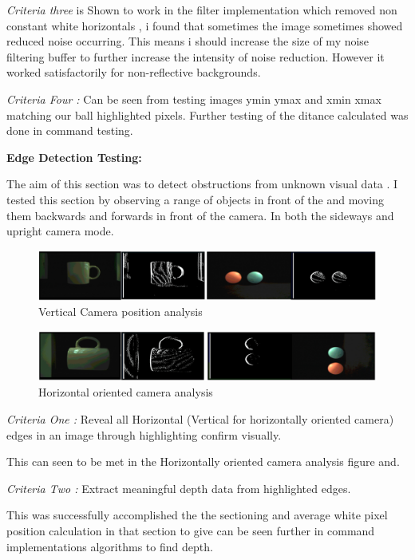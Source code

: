 \documentclass[10pt,twoside]{article}
\begin{document}
\textit{Criteria three} is Shown to work in the filter implementation which removed non constant white horizontals , i found that sometimes the image sometimes showed reduced noise occurring. This means i should increase the size of my noise filtering buffer to further increase the intensity of noise reduction. However it worked satisfactorily for non-reflective backgrounds. 
 
\textit{Criteria Four : } Can be seen from testing images ymin ymax and xmin xmax matching our ball highlighted pixels. Further testing of the ditance calculated was done in command testing.


\textbf{Edge Detection Testing: }

The aim of this section was to detect obstructions from unknown visual data . I tested this section by observing a range of objects in front of the and moving them backwards and forwards in front of the camera. In both the sideways and upright camera mode.

\begin{figure}[hbt!]
    \centering
    \includegraphics[scale=0.3]{VerticalOrientEdge.PNG}
    \captionsetup{justification=centering}
    \caption{Vertical Camera position analysis}
\end{figure}

\begin{figure}[hbt!]
    \centering
    \includegraphics[scale=0.295]{HorizontalOrientEdge.PNG}
    \captionsetup{justification=centering}
    \caption{Horizontal oriented camera analysis}
\end{figure}

\textit{Criteria One : }Reveal all Horizontal (Vertical for horizontally oriented camera) edges in an image through highlighting confirm visually. 

This can seen to be met in the Horizontally oriented camera analysis figure and. 

\textit{Criteria Two : } Extract meaningful depth data from highlighted edges. 

This was successfully accomplished the the sectioning and average white pixel  position calculation in that section to give can be seen further in command implementations algorithms to find depth. 
\end{document}
